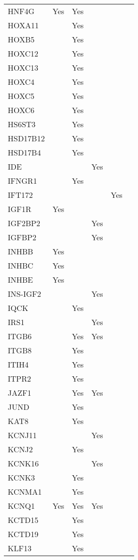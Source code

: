\documentclass[twoside,openright]{report}
\begin{document}
\begin{appendices}
\begin{longtable}[t]{llllll}
HNF4G & Yes & Yes &  &  & \\
HOXA11 &  & Yes &  &  & \\
HOXB5 &  & Yes &  &  & \\
HOXC12 &  & Yes &  &  & \\
HOXC13 &  & Yes &  &  & \\
HOXC4 &  & Yes &  &  & \\
HOXC5 &  & Yes &  &  & \\
HOXC6 &  & Yes &  &  & \\
HS6ST3 &  & Yes &  &  & \\
HSD17B12 &  & Yes &  &  & \\
HSD17B4 &  & Yes &  &  & \\
IDE &  &  & Yes &  & \\
IFNGR1 &  & Yes &  &  & \\
IFT172 &  &  &  & Yes & \\
IGF1R & Yes &  &  &  & \\
IGF2BP2 &  &  & Yes &  & \\
IGFBP2 &  &  & Yes &  & \\
INHBB & Yes &  &  &  & \\
INHBC & Yes &  &  &  & \\
INHBE & Yes &  &  &  & \\
INS-IGF2 &  &  & Yes &  & \\
IQCK &  & Yes &  &  & \\
IRS1 &  &  & Yes &  & \\
ITGB6 &  & Yes & Yes &  & \\
ITGB8 &  & Yes &  &  & \\
ITIH4 &  & Yes &  &  & \\
ITPR2 &  & Yes &  &  & \\
JAZF1 &  & Yes & Yes &  & \\
JUND &  & Yes &  &  & \\
KAT8 &  & Yes &  &  & \\
KCNJ11 &  &  & Yes &  & \\
KCNJ2 &  & Yes &  &  & \\
KCNK16 &  &  & Yes &  & \\
KCNK3 &  & Yes &  &  & \\
KCNMA1 &  & Yes &  &  & \\
KCNQ1 & Yes & Yes & Yes &  & \\
KCTD15 &  & Yes &  &  & \\
KCTD19 &  & Yes &  &  & \\
KLF13 &  & Yes &  &  & \\

\end{longtable}
\end{appendices}
\end{document}
